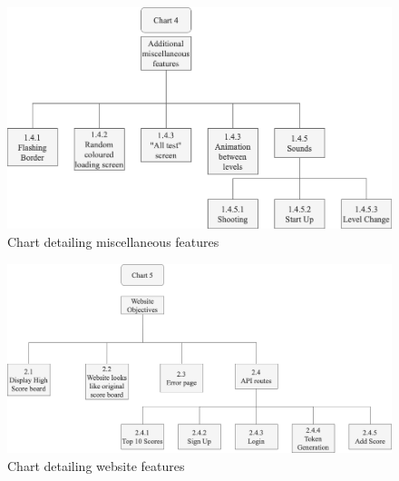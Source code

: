 \begin{figure}[H]
  \includegraphics[width=1\linewidth]{Figures/chart4.png}
  \centering
  \caption{Chart detailing miscellaneous features}
  \label{fig:Chart_4}
  
\end{figure}
\begin{figure}[H]
  \includegraphics[width=1\linewidth]{Figures/chart5.png}
  \centering
  \caption{Chart detailing website features}
  \label{fig:Chart_5}
\end{figure}

